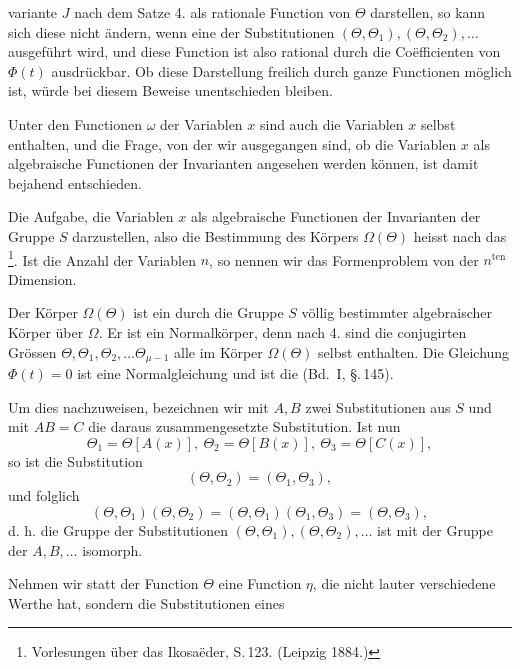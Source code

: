 variante $J$ nach dem Satze 4. als rationale Function von $\Theta$
darstellen, so kann sich diese nicht ändern, wenn eine der Substitutionen
$(\Theta, \Theta_1), (\Theta, \Theta_2), \dots$ ausgeführt wird, und diese Function
ist also rational durch die Co\"efficienten von $\Phi(t)$ ausdrückbar.
Ob diese Darstellung freilich durch ganze Functionen
möglich ist, würde bei diesem Beweise unentschieden bleiben.

Unter den Functionen $\omega$ der Variablen $x$ sind auch die
Variablen $x$ selbst enthalten, und die Frage, von der wir ausgegangen
sind, ob die Variablen $x$ als algebraische Functionen
der Invarianten angesehen werden können, ist damit bejahend
entschieden.

Die Aufgabe, die Variablen $x$ als algebraische Functionen
der Invarianten der Gruppe $S$ darzustellen, also die Bestimmung
des Körpers $\Omega(\Theta)$ heisst nach  das \footnote{Vorlesungen über das Ikosaëder, S.\,123. (Leipzig 1884.)}. Ist die Anzahl der Variablen $n$, so nennen
wir das Formenproblem von der $n^{\text{ten}}$ Dimension.

Der Körper $\Omega(\Theta)$ ist ein durch die Gruppe $S$ völlig bestimmter
algebraischer Körper über $\Omega$. Er ist ein Normalkörper,
denn nach 4. sind die conjugirten Grössen $\Theta, \Theta_1, \Theta_2, \dots \Theta_{\mu-1}$
alle im Körper $\Omega(\Theta)$ selbst enthalten. Die Gleichung $\Phi(t) = 0$
ist eine Normalgleichung und ist die  (Bd.\ I, \S.\,145).


Um dies nachzuweisen, bezeichnen wir mit $A, B$ zwei Substitutionen
aus $S$ und mit $AB = C$ die daraus zusammengesetzte
Substitution. Ist nun
\[ \Theta_1 = \Theta[A(x)],\ \Theta_2 = \Theta[B(x)],\ \Theta_3 = \Theta[C(x)], \]
so ist die Substitution
\[ (\Theta, \Theta_2) = (\Theta_1, \Theta_3), \]
und folglich
\[ (\Theta, \Theta_1)(\Theta, \Theta_2) = (\Theta, \Theta_1)(\Theta_1, \Theta_3) = (\Theta, \Theta_3), \]
d. h. die Gruppe der Substitutionen $(\Theta, \Theta_1), (\Theta, \Theta_2), \dots$ ist mit
der Gruppe der $A, B, \dots$ isomorph.

Nehmen wir statt der Function $\Theta$ eine Function $\eta$, die nicht
lauter verschiedene Werthe hat, sondern die Substitutionen eines

